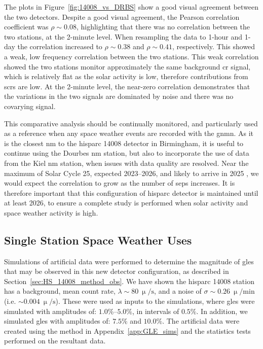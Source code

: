 The plots in Figure~\ref{fig:14008_vs_DRBS} show a good visual agreement between the two detectors. Despite a good visual agreement, the Pearson correlation coefficient was $\rho \sim 0.08$, highlighting that there was no correlation between the two stations, at the 2-minute level. When resampling the data to 1-hour and 1-day the correlation increased to $\rho \sim 0.38$ and $\rho \sim 0.41$, respectively. This showed a weak, low frequency correlation between the two stations. This weak correlation showed the two stations monitor approximately the same background \gls{cr} signal, which is relatively flat as the solar activity is low, therefore contributions from \glspl{scr} are low. At the 2-minute level, the near-zero correlation demonstrates that the variations in the two signals are dominated by noise and there was no covarying signal.

This comparative analysis should be continually monitored, and particularly used as a reference when any space weather events are recorded with the \gls{gnmn}. As it is the closest \gls{nm} to the \gls{hisparc} 14008 detector in Birmingham, it is useful to continue using the Dourbes \gls{nm} station, but also to incorporate the use of data from the Kiel \gls{nm} station, when issues with data quality are resolved. Near the maximum of Solar Cycle 25, expected 2023--2026, and likely to arrive in 2025 \citep{mcintosh_overlapping_2020, pesnell_lessons_2020}, we would expect the correlation to grow as the number of \glspl{sep} increases. It is therefore important that this configuration of \gls{hisparc} detector is maintained until at least 2026, to ensure a complete study is performed when solar activity and space weather activity is high.


\subsection{Single Station Space Weather Uses}\label{sec:HS_14008_single_sims}

Simulations of artificial data were performed to determine the magnitude of \glspl{gle} that may be observed in this new detector configuration, as described in Section~\ref{sec:HS_14008_method_obs}. We have shown the \gls{hisparc} 14008 station has a background, mean count rate, $\lambda\sim80~\upmu/\mathrm{s}$, and a noise of $\sigma\sim0.26~\upmu/\mathrm{min}$ (i.e. $\sim0.004~\upmu/\mathrm{s}$). These were used as inputs to the simulations, where \glspl{gle} were simulated with amplitudes of: $1.0\%$--$5.0\%$, in intervals of $0.5\%$. In addition, we simulated \glspl{gle} with amplitudes of: $7.5\%$ and $10.0\%$. The artificial data were created using the method in Appendix~\ref{app:GLE_sims} and the statistics tests performed on the resultant data.

